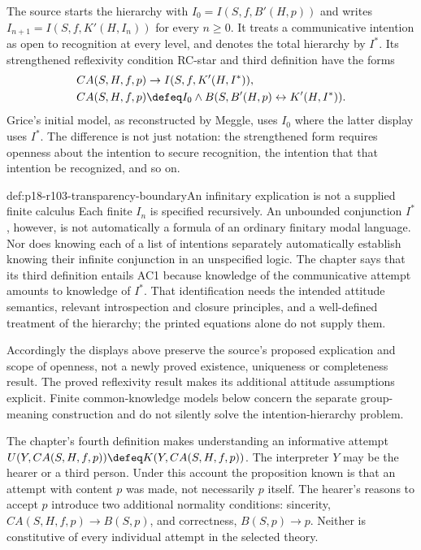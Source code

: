 The source starts the hierarchy with
\(I_0=I(S,f,B'(H,p))\) and writes
\(I_{n+1}=I(S,f,K'(H,I_n))\) for every \(n\geq0\).
It treats a communicative intention as open to recognition at every
level, and denotes the total hierarchy by \(I^*\). Its strengthened
reflexivity condition RC-star and third definition have the forms
\[
\begin{aligned}
 CA(S,H,f,p)&\to I(S,f,K'(H,I^*)),\\
 CA(S,H,f,p)&\defeq
 I_0\land B(S,B'(H,p)\leftrightarrow K'(H,I^*)).
\end{aligned}
\]
Grice's initial model, as reconstructed by Meggle, uses \(I_0\) where
the latter display uses \(I^*\). The difference is not just notation:
the strengthened form requires openness about the intention to secure
recognition, the intention that that intention be recognized, and so on.

\begin{proofboundary}{def:p18-r103-transparency-boundary}{An infinitary explication is not a supplied finite calculus}
Each finite \(I_n\) is specified recursively. An unbounded conjunction
\(I^*\), however, is not automatically a formula of an ordinary finitary
modal language. Nor does knowing each of a list of intentions separately
automatically establish knowing their infinite conjunction in an unspecified
logic. The chapter says that its third definition entails AC1 because
knowledge of the communicative attempt amounts to knowledge of \(I^*\).
That identification needs the intended attitude semantics, relevant
introspection and closure principles, and a well-defined treatment of the
hierarchy; the printed equations alone do not supply them.

Accordingly the displays above preserve the source's proposed explication
and scope of openness, not a newly proved existence, uniqueness or
completeness result. The proved reflexivity result makes its additional
attitude assumptions explicit. Finite common-knowledge models below concern
the separate group-meaning construction and do not silently solve the
intention-hierarchy problem.
\cite[pp.~602--603]{Meggle2021RationalityCommunication}
\end{proofboundary}

The chapter's fourth definition makes understanding an informative
attempt \(U(Y,CA(S,H,f,p))\defeq K(Y,CA(S,H,f,p))\).
The interpreter \(Y\) may be the hearer or a third person. Under this
account the proposition known is that an attempt with content \(p\)
was made, not necessarily \(p\) itself. The hearer's reasons to accept
\(p\) introduce two additional normality conditions: sincerity,
\(CA(S,H,f,p)\to B(S,p)\), and correctness,
\(B(S,p)\to p\). Neither is constitutive of every individual attempt
in the selected theory.

